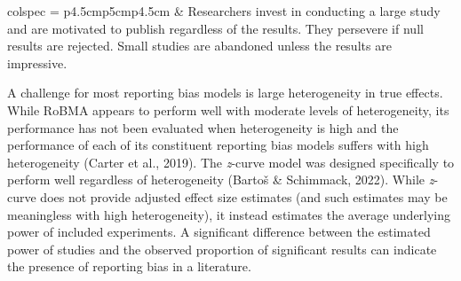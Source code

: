 \documentclass[
  man, donotrepeattitle,floatsintext]{apa7}
\begin{document}
\begin{longtblr}[
  caption = {The selection and regression models used in our robust Bayesian meta-analysis approach.},
  label = {tab:table1},
]{colspec = {p{4.5cm}p{5cm}p{4.5cm}}}
   &
  Researchers invest in conducting a large study and are motivated to publish regardless of the results. They persevere if null results are rejected. Small studies are abandoned unless the results are impressive. \\
\bottomrule
\end{longtblr}

\clearpage

\linespread{1.75}

\normalsize

A challenge for most reporting bias models is large heterogeneity in true effects. While RoBMA appears to perform well with moderate levels of heterogeneity, its performance has not been evaluated when heterogeneity is high and the performance of each of its constituent reporting bias models suffers with high heterogeneity (Carter et al., 2019). The \emph{z}-curve model was designed specifically to perform well regardless of heterogeneity (Bartoš \& Schimmack, 2022). While \emph{z}-curve does not provide adjusted effect size estimates (and such estimates may be meaningless with high heterogeneity), it instead estimates the average underlying power of included experiments. A significant difference between the estimated power of studies and the observed proportion of significant results can indicate the presence of reporting bias in a literature.
\end{document}
